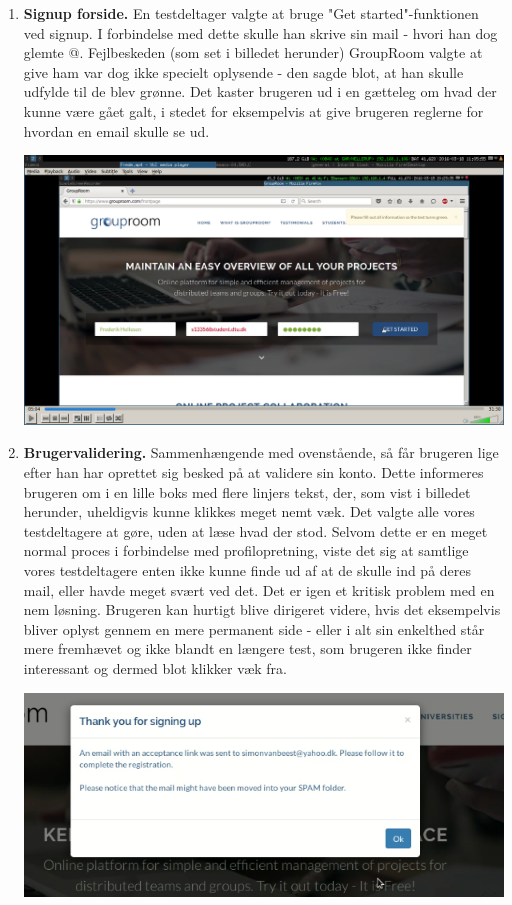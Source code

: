 \documentclass[12pt]{article}
\begin{document}
\begin{enumerate}
  \item \textbf{Signup forside.} En testdeltager valgte at bruge "Get started"-funktionen ved signup. I forbindelse med dette skulle han skrive sin mail - hvori han dog glemte @. Fejlbeskeden (som set i billedet herunder) GroupRoom valgte at give ham var dog ikke specielt oplysende - den sagde blot, at han skulle udfylde til de blev grønne. Det kaster brugeren ud i en gætteleg om hvad der kunne være gået galt, i stedet for eksempelvis at give brugeren reglerne for hvordan en email skulle se ud.
  
  \begin{center}\includegraphics[scale=0.35]{Billeder/Bad-Help-Message}\end{center}
  
  \item \textbf{Brugervalidering.} Sammenhængende med ovenstående, så får brugeren lige efter han har oprettet sig besked på at validere sin konto. Dette informeres brugeren om i en lille boks med flere linjers tekst, der, som vist i billedet herunder, uheldigvis kunne klikkes meget nemt væk. Det valgte alle vores testdeltagere at gøre, uden at læse hvad der stod. Selvom dette er en meget normal proces i forbindelse med profilopretning, viste det sig at samtlige vores testdeltagere enten ikke kunne finde ud af at de skulle ind på deres mail, eller havde meget svært ved det. Det er igen et kritisk problem med en nem løsning. Brugeren kan hurtigt blive dirigeret videre, hvis det eksempelvis bliver oplyst gennem en mere permanent side - eller i alt sin enkelthed står mere fremhævet og ikke blandt en længere test, som brugeren ikke finder interessant og dermed blot klikker væk fra.
  
    \begin{center}\includegraphics[scale=0.4]{Billeder/Email-Message}\end{center}
  


\end{enumerate}
\end{document}
